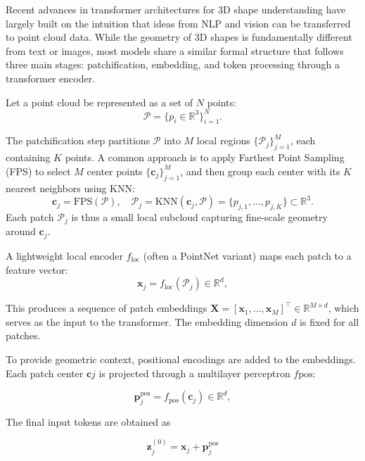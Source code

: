 Recent advances in transformer architectures for 3D shape understanding have largely built on the intuition that ideas from NLP and vision can be transferred to point cloud data. While the geometry of 3D shapes is fundamentally different from text or images, most models share a similar formal structure that follows three main stages: patchification, embedding, and token processing through a transformer encoder.

Let a point cloud be represented as a set of $N$ points: 
\begin{equation}
    \mathcal{P}=\{p_i \in \mathbb{R}^3\}_{i=1}^N.
\end{equation}

The patchification step partitions $\mathcal{P}$ into $M$ local regions $\{ \mathcal{P}_j \}_{j=1}^{M}$, each containing $K$ points. A common approach is to apply Farthest Point Sampling (FPS) to select $M$ center points $\{ \mathbf{c}_j \}_{j=1}^{M}$, and then group each center with its $K$ nearest neighbors using KNN:
\begin{equation}
    \mathbf{c}_j = \text{FPS}(\mathcal{P}), \quad \mathcal{P}_j = \text{KNN}(\mathbf{c}_j, \mathcal{P}) = \{p_{j,1},\dots,p_{j,K}\} \subset \mathbb{R}^3.
\end{equation}
Each patch $\mathcal{P}_j$ is thus a small local subcloud capturing fine-scale geometry around $\mathbf{c}_j$.

A lightweight local encoder $f_{\text{loc}}$ (often a PointNet variant) maps each patch to a feature vector:
\begin{equation}
    \mathbf{x}_j = f_{\text{loc}}(\mathcal{P}_j) \in \mathbb{R}^d,
\end{equation}

This produces a sequence of patch embeddings $\mathbf{X} = [\mathbf{x}_1, \dots, \mathbf{x}_M]^{\top} \in \mathbb{R}^{M \times d}$, which serves as the input to the transformer. The embedding dimension $d$ is fixed for all patches.

To provide geometric context, positional encodings are added to the embeddings. Each patch center $\mathbf{c}j$ is projected through a multilayer perceptron $f{\text{pos}}$:

\begin{equation}
  \mathbf{p}_j^\text{pos} = f_{\text{pos}}(\mathbf{c}_j) \in \mathbb{R}^d,
\end{equation}

The final input tokens are obtained as

\begin{equation}
  \mathbf{z}_j^{(0)} = \mathbf{x}_j + \mathbf{p}_j^\text{pos}
\end{equation}

